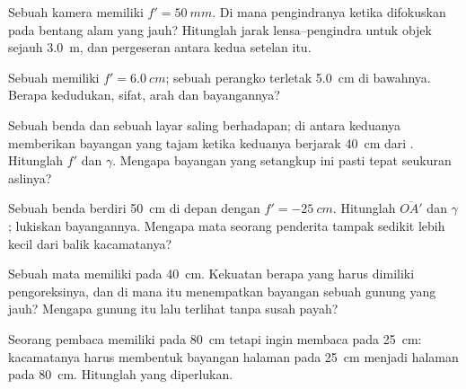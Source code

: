 \begin{exercise}[$\star\star$]\label{exo:g11:lenses-and-eye:6}
Sebuah  kamera memiliki $f' = \qty{50}{mm}$. Di mana pengindranya
ketika difokuskan pada bentang alam yang jauh? Hitunglah jarak
lensa--pengindra untuk objek sejauh \qty{3.0}{m}, dan pergeseran antara
kedua setelan itu.
\end{exercise}

\begin{exercise}[$\star\star$]\label{exo:g11:lenses-and-eye:7}
Sebuah  memiliki $f' = \qty{6.0}{cm}$; sebuah perangko terletak
\qty{5.0}{cm} di bawahnya. Berapa kedudukan, sifat, arah dan 
bayangannya?
\end{exercise}

\begin{exercise}[$\star\star$]\label{exo:g11:lenses-and-eye:8}
Sebuah benda dan sebuah layar saling berhadapan;  di
antara keduanya memberikan bayangan yang tajam ketika keduanya berjarak
\qty{40}{cm} dari . Hitunglah $f'$ dan $\gamma$. Mengapa
bayangan yang setangkup ini pasti tepat seukuran aslinya?
\end{exercise}

\begin{exercise}[$\star\star$]\label{exo:g11:lenses-and-eye:9}
Sebuah benda berdiri \qty{50}{cm} di depan  dengan
$f' = \qty{-25}{cm}$. Hitunglah $\overline{OA'}$ dan $\gamma$; lukiskan
bayangannya. Mengapa mata seorang penderita  tampak sedikit lebih
kecil dari balik kacamatanya?
\end{exercise}

\begin{exercise}[$\star\star$]\label{exo:g11:lenses-and-eye:10}
Sebuah mata  memiliki  pada \qty{40}{cm}. Kekuatan
berapa yang harus dimiliki  pengoreksinya, dan di mana  itu
menempatkan bayangan sebuah gunung yang jauh? Mengapa gunung itu lalu
terlihat tanpa susah payah?
\end{exercise}

\begin{exercise}[$\star\star$]\label{exo:g11:lenses-and-eye:11}
Seorang pembaca  memiliki  pada \qty{80}{cm} tetapi
ingin membaca pada \qty{25}{cm}: kacamatanya harus membentuk bayangan
halaman pada \qty{25}{cm} menjadi halaman  pada \qty{80}{cm}.
Hitunglah  yang diperlukan.
\end{exercise}

